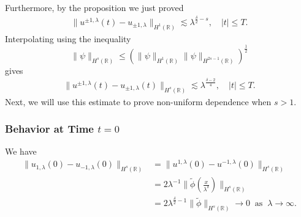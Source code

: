 \documentclass{beamer}
\newcommand{\rr}{\mathbb{R}}
\begin{document}
\begin{frame}

Furthermore, by the proposition we just proved 
%
%
\begin{equation*}
\begin{split}
\|u^{\pm 1, \lambda}(t) - u_{\pm 1, \lambda} \|_{H^1(\rr)} \lesssim
\lambda^{\frac{\delta}{2} -s}, \quad |t| \le T.
\label{apple64}
\end{split}
\end{equation*}
%
%
%
\pause
%
%
%
%
%
Interpolating using 
the inequality
\begin{equation*}
\label{apple403}
\|\psi \|_{H^s (\rr)} \leq  (\| \psi \|_{H^1 (\rr)} \| \psi
\|_{H^{2s-1}(\rr)})^\frac12
\end{equation*}
%
%
gives
%
%
\begin{equation*}
\begin{split}
\|u^{\pm 1, \lambda}(t) - u_{\pm 1, \lambda}(t)
\|_{H^s(\rr)}
\lesssim \lambda^{\frac{\delta -2}{4}}, \quad |t| \le T.
\label{apple65}
\end{split}
\end{equation*}
%
%
Next, we will use this estimate to prove non-uniform
dependence when $s > 1$.

%
\end{frame}

\begin{frame}
	\frametitle{Behavior at Time $t=0$}  We have
%
%
%
%
\begin{equation*}
\begin{split}
\|u_{1,\lambda}(0) - u_{-1,\lambda}(0) \|_{H^s(\rr)} & = \|u^{1,\lambda}(0) 
- u^{-1,\lambda}(0) \|_{H^s(\rr)}
\\
& = 2 \lambda^{-1} \| \tilde{\phi}\left( \frac{x}{\lambda^\delta} \right) 
\|_{H^s(\rr)}
\\
& = 2
\lambda^{\frac{\delta}{2}-1} \|\tilde{\phi} \|_{H^s(\rr)} \to 0
\; \; \text{as} \; \; \lambda \to \infty.
\end{split}
\end{equation*}


\end{frame}
%
%
\end{document}
